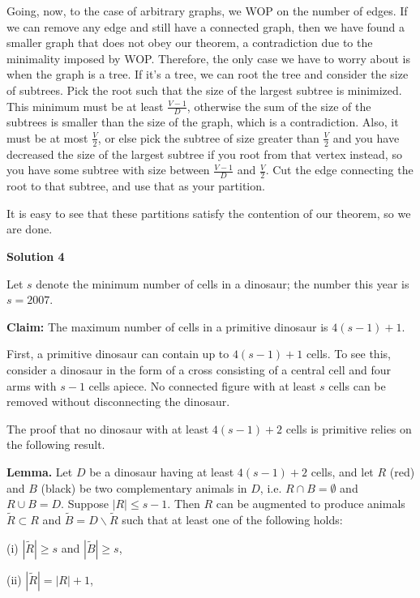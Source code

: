 \begin{enumerate}
 Going, now, to the case of arbitrary graphs, we WOP on the number of edges. If we can remove any edge and still have a connected graph, then we have found a smaller graph that does not obey our theorem, a contradiction due to the minimality imposed by WOP. Therefore, the only case we have to worry about is when the graph is a tree. If it's a tree, we can root the tree and consider the size of subtrees. Pick the root such that the size of the largest subtree is minimized. This minimum must be at least $\frac{V-1}{D}$, otherwise the sum of the size of the subtrees is smaller than the size of the graph, which is a contradiction. Also, it must be at most $\frac{V}{2}$, or else pick the subtree of size greater than $\frac{V}{2}$ and you have decreased the size of the largest subtree if you root from that vertex instead, so you have some subtree with size between $\frac{V-1}{D}$ and $\frac V2$. Cut the edge connecting the root to that subtree, and use that as your partition. 

 It is easy to see that these partitions satisfy the contention of our theorem, so we are done.

 



\textbf{Solution 4}

Let $s$ denote the minimum number of cells in a dinosaur; the number this year is $s = 2007$.

 \textbf{Claim:} The maximum number of cells in a primitive dinosaur is $4(s - 1) + 1$.

 First, a primitive dinosaur can contain up to $4(s - 1) + 1$ cells. To see this, consider a dinosaur in the form of a cross consisting of a central cell and four arms with $s - 1$ cells apiece. No connected figure with at least $s$ cells can be removed without disconnecting the dinosaur.

 The proof that no dinosaur with at least $4(s - 1) + 2$ cells is primitive relies on the following result.

 \textbf{Lemma.} Let $D$ be a dinosaur having at least $4(s - 1) + 2$ cells, and let $R$ (red) and $B$ (black) be two complementary animals in $D$, i.e. $R\cap B = \emptyset$ and $R\cup B = D$. Suppose $|R|\leq s - 1$. Then $R$ can be augmented to produce animals $\tilde{R}\subset R$ and $\tilde{B} = D\backslash\tilde{R}$ such that at least one of the following holds:

 (i) $|\tilde{R}|\geq s$ and $|\tilde{B}|\geq s$,

 (ii) $|\tilde{R}| = |R| + 1$,


\end{enumerate}
